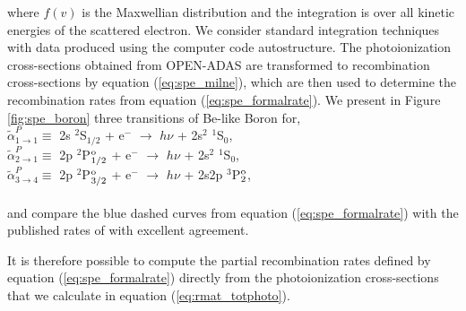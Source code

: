 %
where $f(v)$ is the Maxwellian distribution and the integration is over all kinetic energies of the scattered electron. We consider standard integration techniques with data produced using the computer code {\sc autostructure}. The photoionization cross-sections obtained from OPEN-ADAS are transformed to recombination cross-sections by equation (\ref{eq:spe_milne}), which are then used to determine the recombination rates from equation (\ref{eq:spe_formalrate}). We present in Figure \ref{fig:spe_boron} three transitions of Be-like Boron for,\\
$\tilde{\alpha}^P_{1\rightarrow 1} \equiv$ 2s $^2$S$_{1/2}$ + e$^-$ $\rightarrow$ $h\nu$ + 2s$^2$ $^1$S$_0$, \\
$\tilde{\alpha}^P_{2\rightarrow 1} \equiv$ 2p $^2$P$_{1/2}^{\rm o}$ + e$^-$ $\rightarrow$ $h\nu$ + 2s$^2$ $^1$S$_0$,\\
$\tilde{\alpha}^P_{3\rightarrow 4} \equiv$ 2p $^2$P$_{3/2}^{\rm o}$ + e$^-$ $\rightarrow$ $h\nu$ + 2s2p $^3$P$_2^{\rm o}$,\\\\
and compare the blue dashed curves from equation (\ref{eq:spe_formalrate}) with the published rates of \citet{2006ApJS..167..334B} with excellent agreement.

It is therefore possible to compute the partial recombination rates defined by equation (\ref{eq:spe_formalrate}) directly from the photoionization cross-sections that we calculate in equation (\ref{eq:rmat_totphoto}).







